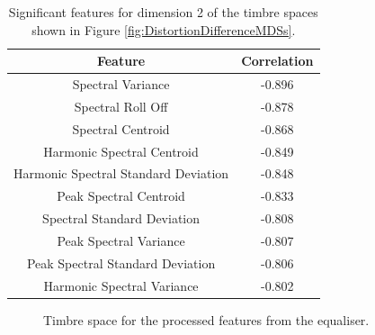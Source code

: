 		\begin{table}[h!]
			\centering
			\begin{tabular}{|c|c|}
				\hline
				\bf{Feature} & \bf{Correlation} \\
				\hline
				\hline
				Spectral Variance & -0.896 \\
				\hline
				Spectral Roll Off & -0.878 \\
				\hline
				Spectral Centroid & -0.868 \\
				\hline
				Harmonic Spectral Centroid & -0.849 \\
				\hline
				Harmonic Spectral Standard Deviation & -0.848 \\
				\hline
				Peak Spectral Centroid & -0.833 \\
				\hline
				Spectral Standard Deviation & -0.808 \\
				\hline
				Peak Spectral Variance & -0.807 \\
				\hline
				Peak Spectral Standard Deviation & -0.806 \\
				\hline
				Harmonic Spectral Variance & -0.802 \\
				\hline
			\end{tabular}
			\caption{Significant features for dimension 2 of the timbre spaces shown in Figure 
				 \ref{fig:DistortionDifferenceMDSs}.}
			\label{tab:DistortionDifferenceFeaturesDim2}
		\end{table}

		\begin{figure}[h!]
			\centering
			\qquad
			\caption{Timbre space for the processed features from the equaliser.}
			\label{fig:EqualiserProcessedMDSs}
		\end{figure}

